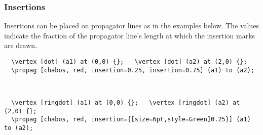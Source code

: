 \documentclass[10pt,letterpaper,twoside,notitlepage]{article}
\numberwithin{figure}{section}
\begin{document}
\subsubsection{Insertions}
\label{sec:_feynmandiagrams_propagators_insertions}
%
\noindent
Insertions can be placed on propagator lines as in the examples below.
The values indicate the fraction of the propagator line's length
at which the insertion marks are drawn.
\\
%
\begin{minipage}{0.83\linewidth}
\vercol\begin{verbatim}
  \vertex [dot] (a1) at (0,0) {};   \vertex [dot] (a2) at (2,0) {};
  \propag [chabos, red, insertion=0.25, insertion=0.75] (a1) to (a2);
\end{verbatim}\txcol
\end{minipage}
%
\begin{minipage}{0.16\linewidth}
\end{minipage}
\\
\begin{minipage}{0.83\linewidth}
\vercol\begin{verbatim}
  \vertex [ringdot] (a1) at (0,0) {};   \vertex [ringdot] (a2) at (2,0) {};
  \propag [chabos, red, insertion={[size=6pt,style=Green]0.25}] (a1) to (a2);
\end{verbatim}\txcol
\end{minipage}
%
\begin{minipage}{0.16\linewidth}
\end{minipage}

%
\end{document}
